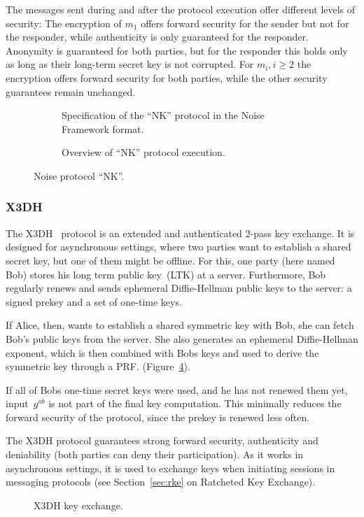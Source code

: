 The messages sent during and after the protocol execution offer different levels of security: 
The encryption of $m_1$ offers forward security for the sender but not for the responder, while authenticity is only guaranteed for the responder.
Anonymity is guaranteed for both parties, but for the responder this holds only as long as their long-term secret key is not corrupted.
For $m_i, i\geq 2$ the encryption offers forward security for both parties, while the other security guarantees remain unchanged.

\begin{figure}[!ht]
    \centering
    \begin{subfigure}{.33\textwidth}
        \centering
        
        \caption{Specification of the ``NK'' protocol in the Noise Framework format.}
        \label{fig:ake:noise:nk}
    \end{subfigure}\hfill
    \begin{subfigure}{.66\textwidth}
        \centering
        
        \caption{Overview of ``NK'' protocol execution.}
        \label{fig:ake:noise:nk_overview}
    \end{subfigure}
    \caption{Noise protocol ``NK''.}
    \label{fig:ake:noise}
\end{figure}

\subsubsection{X3DH}
\label{sec:AKE:X3DH}
The X3DH~\cite{X3DH} protocol is an extended and authenticated 2-pass key exchange. 
It is designed for asynchronous settings, where two parties want to establish a shared secret key, but one of them might be offline.
For this, one party (here named Bob) stores his long term public key~(LTK) at a server.
Furthermore, Bob regularly renews and sends ephemeral Diffie-Hellman public keys to the server: a signed prekey and a set of one-time keys.

If Alice, then, wants to establish a shared symmetric key with Bob, she can fetch Bob's public keys from the server.
She also generates an ephemeral Diffie-Hellman exponent, which is then combined with Bobs keys and used to derive the symmetric key through a PRF. (Figure~\ref{fig:ake:x3dh}).

If all of Bobs one-time secret keys were used, and he has not renewed them yet, input~$g^{ab}$ is not part of the final key computation.
This minimally reduces the forward security of the protocol, since the prekey is renewed less often.

The X3DH protocol guarantees strong forward security, authenticity and deniability (both parties can deny their participation).
As it works in asynchronous settings, it is used to exchange keys when initiating sessions in messaging protocols (see Section~\ref{sec:rke} on Ratcheted Key Exchange).

\begin{figure}[!ht]
    \centering
    
    \caption{X3DH key exchange.}
    \label{fig:ake:x3dh}
\end{figure}
